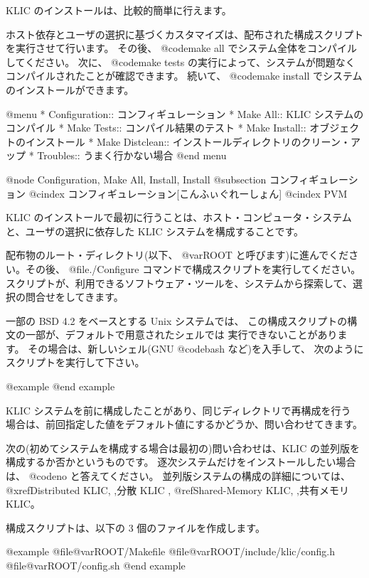 {{{{KLIC のインストールは、比較的簡単に行えます。

ホスト依存とユーザの選択に基づくカスタマイズは、配布された構成スクリプトを実行させて行います。
その後、 @code{make all} でシステム全体をコンパイルしてください。
次に、 @code{make tests} の実行によって、システムが問題なくコンパイルされたことが確認できます。
続いて、 @code{make install} でシステムのインストールができます。

@menu
* Configuration::               コンフィギュレーション
* Make All::                    KLIC システムのコンパイル
* Make Tests::                  コンパイル結果のテスト
* Make Install::                オブジェクトのインストール
* Make Distclean::              インストールディレクトリのクリーン・アップ
* Troubles::                    うまく行かない場合
@end menu

@node Configuration, Make All, Install, Install
@subsection コンフィギュレーション
@cindex コンフィギュレーション[こんふぃぐれーしょん]
@cindex PVM

KLIC のインストールで最初に行うことは、ホスト・コンピュータ・システムと、ユーザの選択に依存した KLIC システムを構成することです。

配布物のルート・ディレクトリ(以下、 @var{ROOT} と呼びます)に進んでください。その後、 @file{./Configure} コマンドで構成スクリプトを実行してください。
スクリプトが、利用できるソフトウェア・ツールを、システムから探索して、選択の問合せをしてきます。

一部の BSD 4.2 をベースとする Unix システムでは、
この構成スクリプトの構文の一部が、デフォルトで用意されたシェルでは
実行できないことがあります。
その場合は、新しいシェル(GNU @code{bash} など)を入手して、
次のようにスクリプトを実行して下さい。

@example
@end example

KLIC システムを前に構成したことがあり、同じディレクトリで再構成を行う
場合は、前回指定した値をデフォルト値にするかどうか、問い合わせてきます。

次の(初めてシステムを構成する場合は最初の)問い合わせは、KLIC の並列版を
構成するか否かというものです。
逐次システムだけをインストールしたい場合は、 @code{no} と答えてください。
並列版システムの構成の詳細については、
@xref{Distributed KLIC, ,分散 KLIC} ,
@ref{Shared-Memory KLIC, ,共有メモリ KLIC}。

構成スクリプトは、以下の 3 個のファイルを作成します。

@example
@file{@var{ROOT}/Makefile}
@file{@var{ROOT}/include/klic/config.h}
@file{@var{ROOT}/config.sh}
@end example

}}}}
